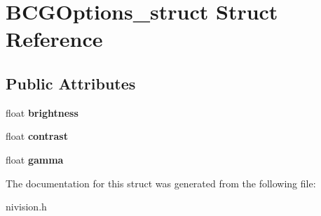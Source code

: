 \hypertarget{structBCGOptions__struct}{
\section{BCGOptions\_\-struct Struct Reference}
\label{structBCGOptions__struct}
}
\subsection*{Public Attributes}
\begin{DoxyCompactItemize}
\item 
\hypertarget{structBCGOptions__struct_a2d1099b355f750368416e1785044af10}{
float {\bfseries brightness}}
\label{structBCGOptions__struct_a2d1099b355f750368416e1785044af10}

\item 
\hypertarget{structBCGOptions__struct_a7871b385e199636c8d057f8f567c5aae}{
float {\bfseries contrast}}
\label{structBCGOptions__struct_a7871b385e199636c8d057f8f567c5aae}

\item 
\hypertarget{structBCGOptions__struct_a3a24b83f7b84ca3ecd90a1e4e6361d7b}{
float {\bfseries gamma}}
\label{structBCGOptions__struct_a3a24b83f7b84ca3ecd90a1e4e6361d7b}

\end{DoxyCompactItemize}


The documentation for this struct was generated from the following file:\begin{DoxyCompactItemize}
\item 
nivision.h\end{DoxyCompactItemize}
